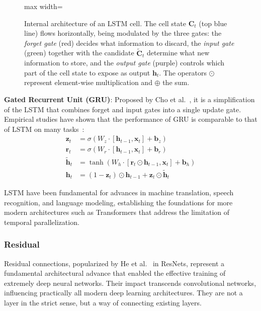 \begin{figure}[htbp]
\begin{adjustbox}{max width=\textwidth}
\begin{tikzpicture}
\end{tikzpicture}
\end{adjustbox}
\caption[LSTM cell architecture]{Internal architecture of an LSTM cell. The cell state $\mathbf{C}_t$ (top blue line) flows horizontally, being modulated by the three gates: the \textit{forget gate} (red) decides what information to discard, the \textit{input gate} (green) together with the candidate $\tilde{\mathbf{C}}_t$ determine what new information to store, and the \textit{output gate} (purple) controls which part of the cell state to expose as output $\mathbf{h}_t$. The operators $\odot$ represent element-wise multiplication and $\oplus$ the sum.}
\label{fig:lstm_arquitectura}
\end{figure}

\textbf{Gated Recurrent Unit (GRU)}: Proposed by Cho et al.~\citep{cho2014learning}, it is a simplification of the \gls{LSTM} that combines forget and input gates into a single update gate. Empirical studies have shown that the performance of \gls{GRU} is comparable to that of \gls{LSTM} on many tasks~\citep{chung2014empirical}:
\begin{align}
\mathbf{z}_t &= \sigma(W_z \cdot [\mathbf{h}_{t-1}, \mathbf{x}_t] + \mathbf{b}_z) \\
\mathbf{r}_t &= \sigma(W_r \cdot [\mathbf{h}_{t-1}, \mathbf{x}_t] + \mathbf{b}_r) \\
\tilde{\mathbf{h}}_t &= \tanh(W_h \cdot [\mathbf{r}_t \odot \mathbf{h}_{t-1}, \mathbf{x}_t] + \mathbf{b}_h) \\
\mathbf{h}_t &= (1 - \mathbf{z}_t) \odot \mathbf{h}_{t-1} + \mathbf{z}_t \odot \tilde{\mathbf{h}}_t
\end{align}

\gls{LSTM} have been fundamental for advances in machine translation, speech recognition, and language modeling, establishing the foundations for more modern architectures such as \glspl{Transformer} that address the limitation of temporal parallelization.

\subsubsection{Residual}

Residual connections, popularized by He et al.~\citep{he2016deep} in ResNets, represent a fundamental architectural advance that enabled the effective training of extremely deep neural networks. Their impact transcends convolutional networks, influencing practically all modern deep learning architectures. They are not a layer in the strict sense, but a way of connecting existing layers.

